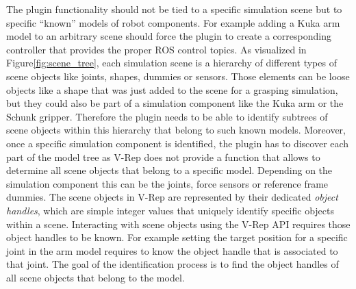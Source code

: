 The plugin functionality should not be tied to a specific simulation scene but to specific ``known'' models of robot components. For example adding a Kuka arm model to an arbitrary scene should force the plugin to create a corresponding controller that provides the proper ROS control topics. As visualized in Figure\ref{fig:scene_tree}, each simulation scene is a hierarchy of different types of scene objects like joints, shapes, dummies or sensors. Those elements can be loose objects like a shape that was just added to the scene for a grasping simulation, but they could also be part of a simulation component like the Kuka arm or the Schunk gripper. Therefore the plugin needs to be able to identify subtrees of scene objects within this hierarchy that belong to such known models. Moreover, once a specific simulation component is identified, the plugin has to discover each part of the model tree as V-Rep does not provide a function that allows to determine all scene objects that belong to a specific model. Depending on the simulation component this can be the joints, force sensors or reference frame dummies. The scene objects in V-Rep are represented by their dedicated \emph{object handles}, which are simple integer values that uniquely identify specific objects within a scene. Interacting with scene objects using the V-Rep API requires those object handles to be known. For example setting the target position for a specific joint in the arm model requires to know the object handle that is associated to that joint. The goal of the identification process is to find the object handles of all scene objects that belong to the model. \\

